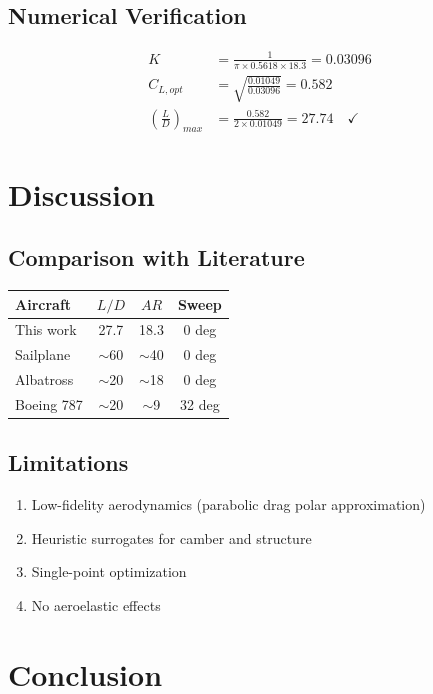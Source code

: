 \documentclass[11pt,a4paper]{article}
\begin{document}
\subsection{Numerical Verification}

\begin{align}
K &= \frac{1}{\pi \times 0.5618 \times 18.3} = 0.03096 \\
C_{L,opt} &= \sqrt{\frac{0.01049}{0.03096}} = 0.582 \\
\left(\frac{L}{D}\right)_{max} &= \frac{0.582}{2 \times 0.01049} = 27.74 \quad \checkmark
\end{align}

\section{Discussion}

\subsection{Comparison with Literature}

\begin{center}
\begin{tabular}{|l|c|c|c|}
\hline
Aircraft & $L/D$ & $AR$ & Sweep \\
\hline
This work & 27.7 & 18.3 & 0 deg \\
Sailplane & $\sim$60 & $\sim$40 & 0 deg \\
Albatross & $\sim$20 & $\sim$18 & 0 deg \\
Boeing 787 & $\sim$20 & $\sim$9 & 32 deg \\
\hline
\end{tabular}
\end{center}

\subsection{Limitations}

\begin{enumerate}
    \item Low-fidelity aerodynamics (parabolic drag polar approximation)
    \item Heuristic surrogates for camber and structure
    \item Single-point optimization
    \item No aeroelastic effects
\end{enumerate}

\section{Conclusion}
\end{document}
